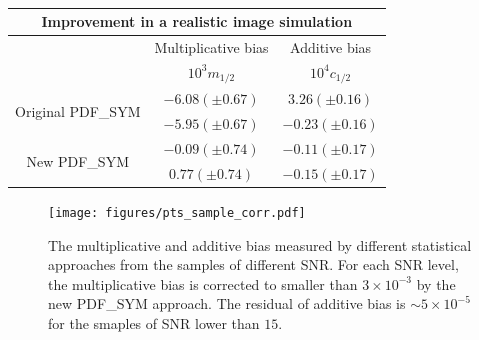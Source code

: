 \documentclass[twocolumn]{aastex62}
\begin{document}
\begin{table}
\centering
\caption{}\label{tb:real_simu}
\begin{tabular}{ccc}
	\multicolumn{3}{c}{Improvement in a realistic image simulation} \\
	\hline 
	\hline 
	& Multiplicative bias& Additive bias \\ 
	& $10^3m_{1/2}$& $10^4c_{1/2}$ \\
	\hline 
	\multirow{2}{*}{Original PDF\_SYM}&  $-6.08(\pm0.67)$&  $3.26(\pm0.16)$\\ 
	&  $-5.95(\pm0.67)$&  $-0.23(\pm0.16)$\\ 
	\hline 
	\multirow{2}{*}{New PDF\_SYM}&  $-0.09(\pm0.74)$&  $-0.11(\pm0.17)$\\ 
	&  $0.77(\pm0.74)$&  $-0.15(\pm0.17)$\\ 
	\hline 
\end{tabular}
\end{table} 

\begin{figure}[htbp]
	\centering
	\texttt{[image: figures/pts\_sample\_corr.pdf]}
	\caption{The multiplicative and additive bias measured by different statistical approaches from the samples of different SNR. For each SNR level, the multiplicative bias is corrected to smaller than $3\times10^{-3}$ by the new PDF\_SYM approach. The residual of additive bias is $\sim 5\times10^{-5}$ for the smaples of SNR lower than $15$.}\label{fig:pts_mc_corr}
\end{figure}
\end{document}
